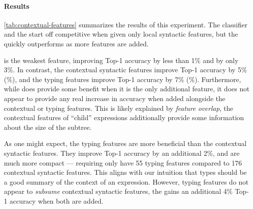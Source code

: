 \begin{table}[ht]
\begin{tabular}{lrcrrrrcrrrr}
    \bottomrule
  \end{tabular}
\end{table}
%
\paragraph{Results}
\autoref{tab:contextual-features} summarizes the results of this experiment.
%
The \linear classifier and the \hiddenFH start off
competitive when given only local syntactic features, but the \hiddenFH
quickly outperforms as more features are added.

\ExprSize is the weakest feature, improving \linear Top-1
accuracy by less than 1\% and \hiddenFH by only 3\%.
%
In contrast, the contextual syntactic features improve \linear Top-1
accuracy by 5\% (\%), and the typing features improve
Top-1 accuracy by 7\% (\%).
%
Furthermore, while \ExprSize does provide some benefit when it is the
only additional feature, it does not appear to provide any real increase
in accuracy when added alongside the contextual or typing features.
%
This is likely explained by \emph{feature overlap}, \ie the contextual
features of ``child'' expressions additionally provide some information
about the size of the subtree.

As one might expect, the typing features are more beneficial than the
contextual syntactic features.
%
They improve Top-1 accuracy by an additional 2\%, and are much more
compact --- requiring only have 55 typing features compared to 176
contextual syntactic features.
%
This aligns with our intuition that types should be a good summary of
the context of an expression.
%
However, typing features do not appear to \emph{subsume} contextual
syntactic features, the \hiddenFH gains an additional 4\% Top-1 accuracy
when both are added.
